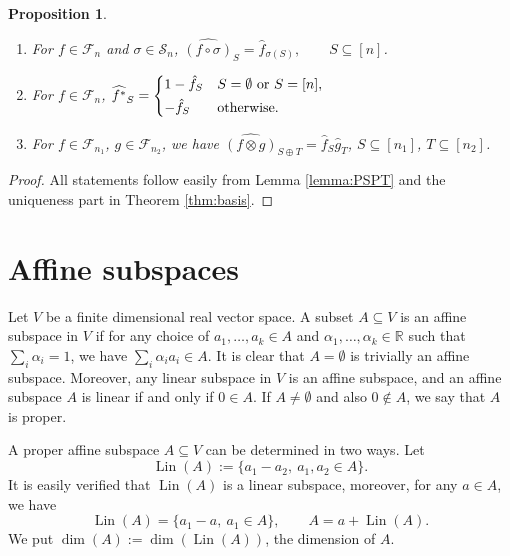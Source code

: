 \documentclass[12pt]{article}
\newtheorem{prop}{Proposition}
\theoremstyle{definition}
\theoremstyle{remark}
\def\lin{\operatorname{Lin}}
\def\Fe{\mathcal F}
\def\permut{\mathscr{S}}
\begin{document}
\begin{prop}\label{prop:mobius} 

\begin{enumerate}
\item[(i)] For $f\in \Fe_n$ and  $\sigma\in \permut_n$, 
$\widehat{(f\circ \sigma)}_S=\hat f_{\sigma(S)}, \qquad S\subseteq [n]$.
\item[(ii)] For $f\in \Fe_n$, $\widehat{f^*}_S=\begin{dcases} 1-\hat f_S & S=\emptyset\text{ or } S=[n],\\
-\hat f_S & \text{otherwise}.
\end{dcases}$
\item[(iii)] For $f\in \Fe_{n_1}$, $g\in \Fe_{n_2}$, we have 
$\widehat{(f\otimes g)}_{S\oplus T}=\hat f_S\hat g_T$, $S\subseteq [n_1]$, $T\subseteq
[n_2]$.
%
\end{enumerate}


\end{prop}

\begin{proof} All statements follow easily from Lemma \ref{lemma:PSPT} and the uniqueness part in Theorem
\ref{thm:basis}. 


\end{proof}

\section{Affine subspaces}

Let $V$ be a finite dimensional real vector space. A subset $A\subseteq V$ is an affine
subspace in $V$ if for any choice of  $a_1,\dots, a_k\in A$ and  $\alpha_1,\dots,\alpha_k\in \mathbb R$
such that $\sum_i\alpha_i=1$, we have $\sum_i\alpha_i a_i\in A$. It is clear that
$A=\emptyset$ is trivially an affine subspace.  Moreover, any linear subspace in $V$ is an affine subspace,
and an
affine subspace $A$ is linear if and only if $0\in A$. If $A \neq\emptyset$ and also
$0\notin A$, we say that $A$ is proper. 

A proper  affine subspace $A\subseteq V$ can be determined in two ways. Let 
\[
\lin(A):=\{a_1-a_2,\ a_1,a_2\in A\}.
\]
It is easily verified that $\lin(A)$ is a linear subspace, moreover, for any $a\in A$, we
have
\begin{equation}\label{eq:affine_l}
\lin(A)=\{a_1-a,\ a_1\in A\},\qquad A=a+\lin(A).
\end{equation}
We put $\dim(A):=\dim(\lin(A))$, the dimension of $A$. 
\end{document}
